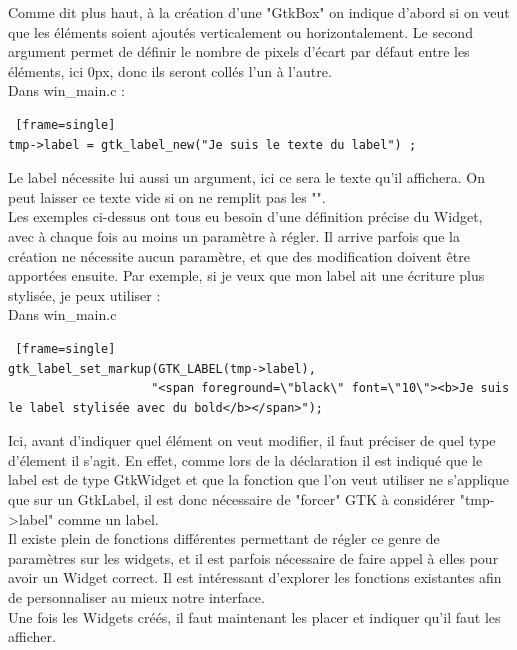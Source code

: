 \documentclass[11pt,french,a4paper]{report}
\begin{document}
Comme dit plus haut, à la création d'une "GtkBox" on indique d'abord si on veut que les éléments soient ajoutés verticalement 
ou horizontalement. Le second argument permet de définir le nombre de pixels d'écart par défaut entre les éléments, 
ici 0px, donc ils seront collés l'un à l'autre.  \\
\small Dans win\_main.c :
\begin{lstlisting} [frame=single]
tmp->label = gtk_label_new("Je suis le texte du label") ; 
\end{lstlisting}
Le label nécessite lui aussi un argument, ici ce sera le texte qu'il affichera. 
On peut laisser ce texte vide si on ne remplit pas les "".  \\
Les exemples ci-dessus ont tous eu besoin d'une définition précise du Widget, avec à chaque fois au moins un paramètre à régler. 
Il arrive parfois que la création ne nécessite aucun paramètre, et que des modification doivent être apportées ensuite. 
Par exemple, si je veux que mon label ait une écriture plus stylisée, je peux utiliser :  \\
\small Dans win\_main.c
\begin{lstlisting} [frame=single]
gtk_label_set_markup(GTK_LABEL(tmp->label), 
                    "<span foreground=\"black\" font=\"10\"><b>Je suis le label stylisée avec du bold</b></span>"); 
\end{lstlisting}
Ici, avant d'indiquer quel élément on veut modifier, il faut préciser de quel type d'élement il s'agit.
En effet, comme lors de la déclaration il est indiqué que le label est de type GtkWidget et que la fonction que l'on veut utiliser 
ne s'applique que sur un GtkLabel, il est donc nécessaire de "forcer" GTK à considérer "tmp->label" comme un label.\\
Il existe plein de fonctions différentes permettant de régler ce genre de paramètres sur les widgets, et il est parfois nécessaire 
de faire appel à elles pour avoir un Widget correct. 
Il est intéressant d'explorer les fonctions existantes afin de personnaliser au mieux notre interface. \\
Une fois les Widgets créés, il faut maintenant les placer et indiquer qu'il faut les afficher. \\ 
\end{document}
